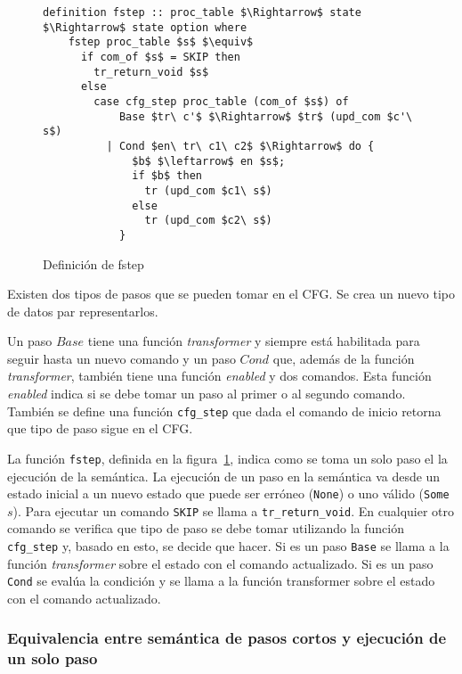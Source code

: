 \begin{figure}
  \begin{lstlisting}[frame=single, mathescape=true]
  definition fstep :: proc_table $\Rightarrow$ state $\Rightarrow$ state option where
    fstep proc_table $s$ $\equiv$
      if com_of $s$ = SKIP then
        tr_return_void $s$
      else
        case cfg_step proc_table (com_of $s$) of
            Base $tr\ c'$ $\Rightarrow$ $tr$ (upd_com $c'\ s$)
          | Cond $en\ tr\ c1\ c2$ $\Rightarrow$ do {
              $b$ $\leftarrow$ en $s$;
              if $b$ then
                tr (upd_com $c1\ s$)
              else  
                tr (upd_com $c2\ s$)
            }
  \end{lstlisting}

  \caption{Definición de fstep}
  \label{fig:fstep_def}
\end{figure}

Existen dos tipos de pasos que se pueden tomar en el CFG.
Se crea un nuevo tipo de datos par representarlos.


Un paso $Base$ tiene una función \textit{transformer} y siempre está habilitada para seguir hasta un nuevo comando y un paso $Cond$ que, además de la función \textit{transformer}, también tiene una función \textit{enabled} y dos comandos.
Esta función \textit{enabled} indica si se debe tomar un paso al primer o al segundo comando.
También se define una función \verb|cfg_step| que dada el comando de inicio retorna que tipo de paso sigue en el CFG.

La función \verb|fstep|, definida en la figura~\ref{fig:fstep_def}, indica como se toma un solo paso el la ejecución de la semántica.
La ejecución de un paso en la semántica va desde un estado inicial a un nuevo estado que puede ser erróneo (\verb|None|) o uno válido (\verb|Some| $s$).
Para ejecutar un comando \verb|SKIP| se llama a \verb|tr_return_void|.
En cualquier otro comando se verifica que tipo de paso se debe tomar utilizando la función \verb|cfg_step| y, basado en esto, se decide que hacer.
Si es un paso \verb|Base| se llama a la función \textit{transformer} sobre el estado con el comando actualizado.
Si es un paso \verb|Cond| se evalúa la condición y se llama a la función transformer sobre el estado con el comando actualizado.

\subsubsection*{Equivalencia entre semántica de pasos cortos y ejecución de un solo paso}\label{subsubsection:equality_ss_ss}

